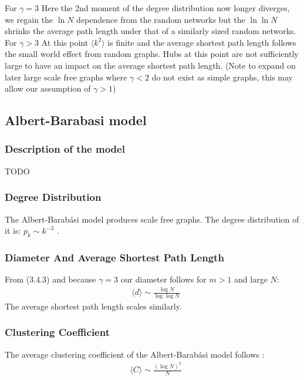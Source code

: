 \documentclass{article}
\begin{document}
            For $\gamma =3$ Here the 2nd moment of the degree distribution now longer diverges, we regain the $\ln N$ dependence from the random networks but the $\ln\ln N$ shrinks the average path length under that of a similarly sized random networks.\\
            For $\gamma > 3$ At this point $\langle k^2 \rangle$ is finite and the average shortest path length follows the small world effect from random graphs. Hubs at this point are not sufficiently large to have an impact on the average shortest path length.
            (Note to expand on later large scale free graphs where $\gamma < 2$ do not exist as simple graphs, this may allow our assumption of $\gamma >1$)
        \subsection{Albert-Barabasi model}
            \subsubsection{Description of the model}
            TODO
            \subsubsection{Degree Distribution}
            The Albert-Barabási model produces scale free graphs. The degree distribution of it is: $p_{k} \sim k^{-3}$ \parencite{barabasi2013network}.
            \subsubsection{Diameter And Average Shortest Path Length}
            From ($3.4.3$) and because $\gamma = 3$ our diameter follows for $m>1$ and large $N$:
            \begin{align*}
                &\langle d \rangle \sim \frac{\log N}{\log \log N}
            \end{align*}
            The average shortest path length scales similarly.
            \subsubsection{Clustering Coefficient}
            The average clustering coefficient of the Albert-Barabási model follows \parencite{barabasi2013network}:
            \begin{align*}
                &\langle C \rangle \sim \frac{(\log N)^2}{N}
            \end{align*}
\end{document}
